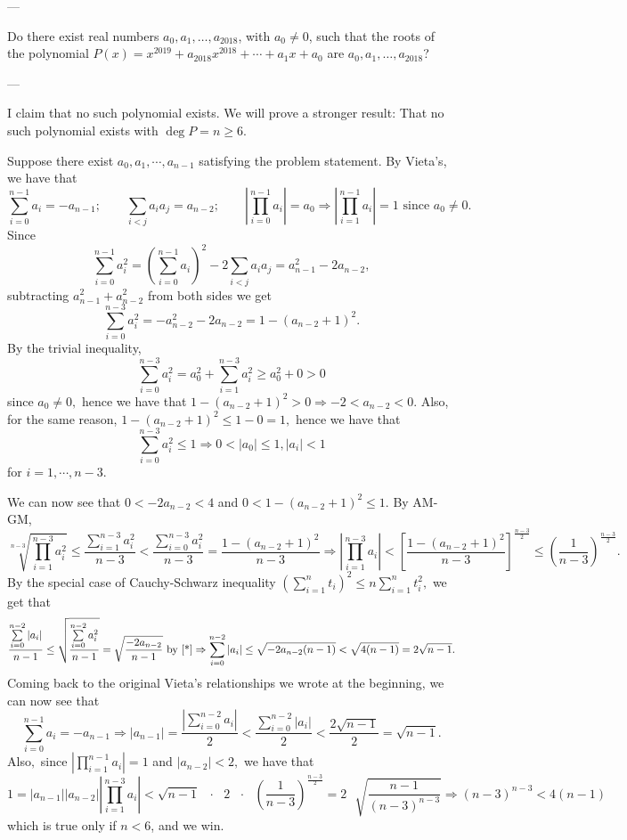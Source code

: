 
---

Do there exist real numbers $a_0,a_1,\ldots,a_{2018}$, with $a_0\ne 0$, such that the roots of the polynomial $P(x)=x^{2019}+a_{2018}x^{2018}+\cdots+a_1x+a_0$ are $a_0,a_1,\ldots,a_{2018}$?

---

I claim that no such polynomial exists. We will prove a stronger result: That no such polynomial exists with $\deg P=n\ge 6$.

Suppose there exist $a_0,a_1,\cdots,a_{n-1}$ satisfying the problem statement. By Vieta's, we have that \[\sum_{i=0}^{n-1}a_i=-a_{n-1};\qquad\sum_{i<j}a_ia_j=a_{n-2};\qquad\left|\prod\limits_{i=0}^{n-1} a_i\right| =a_0\Rightarrow \left|\prod_{i=1}^{n-1} a_i\right|=1 \text{ since }a_0\neq 0.\]
Since
\begin{equation}\label{*}
    \sum\limits_{i=0}^{n-1}a_i^2=\left(\sum\limits_{i=0}^{n-1}a_i\right)^2-2\sum\limits_{i<j}a_ia_j=a_{n-1}^2-2a_{n-2},\tag{$\star$}
\end{equation}
subtracting $a_{n-1}^2+a_{n-2}^2$ from both sides we get \[\sum\limits_{i=0}^{n-3}a_i^2=-a_{n-2}^2-2a_{n-2}=1-(a_{n-2}+1)^2.\]
By the trivial inequality, \[\sum\limits_{i=0}^{n-3}a_i^2=a_0^2+\sum\limits_{i=1}^{n-3}a_i^2\geq a_0^2+0>0\] since $a_0\neq 0,$ hence we have that $1-(a_{n-2}+1)^2>0 \Rightarrow -2<a_{n-2}<0.$ Also, for the same reason, $1-(a_{n-2}+1)^2\leq 1-0=1,$ hence we have that \[\sum\limits_{i=0}^{n-3}a_i^2\leq 1\Rightarrow 0<|a_0|\leq 1, |a_i|<1\] for $i=1,\cdots, n-3.$

We can now see that $0<-2a_{n-2}<4$ and $0<1-(a_{n-2}+1)^2\leq 1.$ By AM-GM, \small{\[\sqrt[n-3]{\prod\limits_{i=1}^{n-3}a_i^2}\leq \frac{\sum\limits_{i=1}^{n-3}a_i^2}{n-3}<\frac{\sum\limits_{i=0}^{n-3}a_i^2}{n-3}=\frac{1-(a_{n-2}+1)^2}{n-3}\Rightarrow \left|\prod\limits_{i=1}^{n-3} a_i\right|<\left[\frac{1-(a_{n-2}+1)^2}{n-3}\right]^{\frac{n-3}{2}}\leq \left(\frac{1}{n-3}\right)^{\frac{n-3}{2}}.\]}
By the special case of Cauchy-Schwarz inequality $\left(\sum\limits_{i=1}^n t_i\right)^2\leq n \sum\limits_{i=1}^n t_i^2,$ we get that \small{\[\frac{\sum\limits_{i=0}^{n-2}|a_i|}{n-1}\leq \sqrt{\frac{\sum\limits_{i=0}^{n-2}a_i^2}{n-1}}=\sqrt{\frac{-2a_{n-2}}{n-1}} \text { by \eqref{*}} \Rightarrow \sum\limits_{i=0}^{n-2}|a_i|\leq \sqrt{-2a_{n-2}(n-1)}<\sqrt{4(n-1)}=2\sqrt{n-1}.\]}
Coming back to the original Vieta's relationships we wrote at the beginning, we can now see that \[\sum\limits_{i=0}^{n-1}a_i=-a_{n-1} \Rightarrow |a_{n-1}|=\frac{\left|\sum\limits_{i=0}^{n-2}a_i\right|}{2}<\frac{\sum\limits_{i=0}^{n-2}|a_i|}{2}<\frac{2\sqrt{n-1}}{2}=\sqrt{n-1}.\]Also$,$ since $\left|\prod\limits_{i=1}^{n-1} a_i\right|=1$ and $|a_{n-2}|<2,$ we have that \small{\[1=|a_{n-1}||a_{n-2}|\left|\prod\limits_{i=1}^{n-3} a_i\right|<
\sqrt{n-1}\text{ } \cdot \text{ }2\text{ }\cdot\text{ } \left(\frac{1}{n-3}\right)^{\frac{n-3}{2}}=2\text{ }\sqrt{\frac{n-1}{(n-3)^{n-3}}}\Rightarrow (n-3)^{n-3}<4(n-1)\]}
which is true only if $n<6$, and we win.

